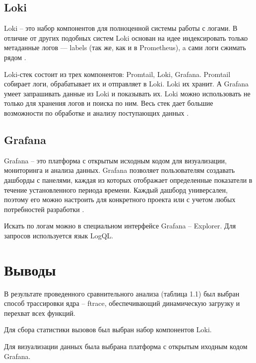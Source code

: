 \subsection{Loki}

Loki -- это набор компонентов для полноценной системы работы с логами. В отличие от других подобных систем Loki основан на идее индексировать только метаданные логов — labels (так же, как и в Prometheus), a сами логи сжимать рядом \cite{loki_logs}.

Loki-стек состоит из трех компонентов: Promtail, Loki, Grafana. Promtail собирает логи, обрабатывает их и отправляет в Loki. Loki их хранит. А Grafana умеет запрашивать данные из Loki и показывать их. Loki можно использовать не только для хранения логов и поиска по ним. Весь стек дает большие возможности по обработке и анализу поступающих данных \cite{loki_logs}.

\subsection{Grafana}

Grafana -- это платформа с открытым исходным кодом для визуализации, мониторинга и анализа данных. Grafana позволяет пользователям создавать дашборды с панелями, каждая из которых отображает определенные показатели в течение установленного периода времени. Каждый дашборд универсален, поэтому его можно настроить для конкретного проекта или с учетом любых потребностей разработки \cite{grafana}.

Искать по логам можно в специальном интерфейсе Grafana -- Explorer. Для запросов используется язык LogQL.

\section{Выводы}

В результате проведенного сравнительного анализа (таблица 1.1) был выбран способ трассировки ядра -- ftrace, обеспечивающий динамическую загрузку и перехват всех функций. 

Для сбора статистики вызовов был выбран набор компонентов Loki. 

Для визуализации данных была выбрана платформа с открытым иходным кодом Grafana.